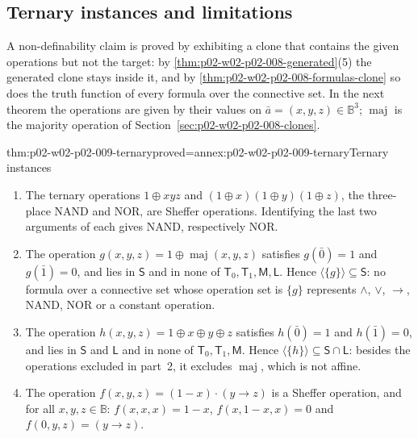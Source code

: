 \subsection{Ternary instances and limitations}
\label{sec:p02-w02-p02-009-ternary}

A non-definability claim is proved by exhibiting a clone that contains the
given operations but not the target: by
\cref{thm:p02-w02-p02-008-generated}(5) the generated clone stays inside it,
and by \cref{thm:p02-w02-p02-008-formulas-clone} so does the truth function of
every formula over the connective set.  In the next theorem the operations
are given by their values on \(\bar a=(x,y,z)\in\mathbb B^3\);
\(\operatorname{maj}\) is the majority operation of
Section~\ref{sec:p02-w02-p02-008-clones}.

\begin{hbtheorem}{thm:p02-w02-p02-009-ternary}{proved=annex:p02-w02-p02-009-ternary}{Ternary instances}
\begin{enumerate}
\item The ternary operations \(1\oplus xyz\) and
  \((1\oplus x)(1\oplus y)(1\oplus z)\), the three-place NAND and NOR, are
  Sheffer operations.  Identifying the last two arguments of each gives
  \(\mathrm{NAND}\), respectively \(\mathrm{NOR}\).
\item The operation \(g(x,y,z)=1\oplus\operatorname{maj}(x,y,z)\) satisfies
  \(g(\bar0)=1\) and \(g(\bar1)=0\), and lies in \(\mathsf S\) and in none of
  \(\mathsf T_0,\mathsf T_1,\mathsf M,\mathsf L\).  Hence
  \(\langle\{g\}\rangle\subseteq\mathsf S\): no formula over a connective
  set whose operation set is \(\{g\}\) represents \(\land\), \(\lor\), \(\to\),
  \(\mathrm{NAND}\), \(\mathrm{NOR}\) or a constant operation.
\item The operation \(h(x,y,z)=1\oplus x\oplus y\oplus z\) satisfies
  \(h(\bar0)=1\) and \(h(\bar1)=0\), and lies in \(\mathsf S\) and
  \(\mathsf L\) and in none of \(\mathsf T_0,\mathsf T_1,\mathsf M\).  Hence
  \(\langle\{h\}\rangle\subseteq\mathsf S\cap\mathsf L\): besides the
  operations excluded in part~2, it excludes \(\operatorname{maj}\), which
  is not affine.
\item The operation \(f(x,y,z)=(1-x)\cdot(y\to z)\) is a Sheffer
  operation, and for all \(x,y,z\in\mathbb B\):
  \(f(x,x,x)=1-x\), \(f(x,1-x,x)=0\) and \(f(0,y,z)=(y\to z)\).
\end{enumerate}
\end{hbtheorem}

